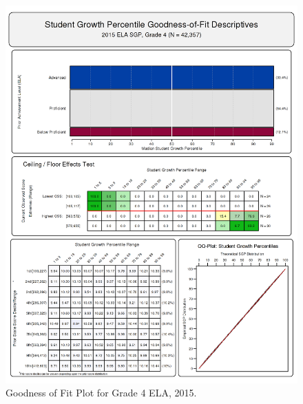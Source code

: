 \documentclass[12pt]{article}
\begin{document}
\begin{figure}[htbp]
\centering
\includegraphics{../img/Goodness_of_Fit/ELA.2015/2015_ELA_4;2014_ELA_3.png}
\caption{Goodness of Fit Plot for Grade 4 ELA, 2015.}
\end{figure}
\end{document}
